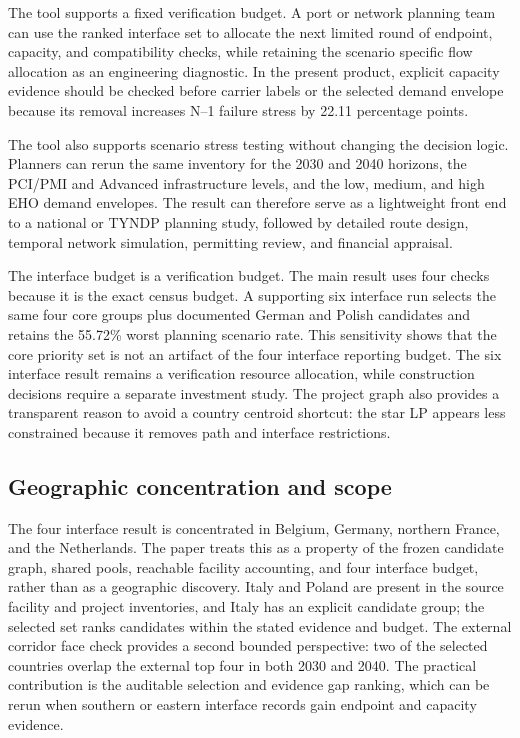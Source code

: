 \documentclass{ieeeaccess}
\begin{document}
The tool supports a fixed verification budget. A port or network planning team can use the ranked interface set to allocate the next limited round of endpoint, capacity, and compatibility checks, while retaining the scenario specific flow allocation as an engineering diagnostic. In the present product, explicit capacity evidence should be checked before carrier labels or the selected demand envelope because its removal increases N--1 failure stress by 22.11 percentage points.

The tool also supports scenario stress testing without changing the decision logic. Planners can rerun the same inventory for the 2030 and 2040 horizons, the PCI/PMI and Advanced infrastructure levels, and the low, medium, and high EHO demand envelopes. The result can therefore serve as a lightweight front end to a national or TYNDP planning study, followed by detailed route design, temporal network simulation, permitting review, and financial appraisal.

The interface budget is a verification budget. The main result uses four checks because it is the exact census budget. A supporting six interface run selects the same four core groups plus documented German and Polish candidates and retains the 55.72\% worst planning scenario rate. This sensitivity shows that the core priority set is not an artifact of the four interface reporting budget. The six interface result remains a verification resource allocation, while construction decisions require a separate investment study. The project graph also provides a transparent reason to avoid a country centroid shortcut: the star LP appears less constrained because it removes path and interface restrictions.

\subsection{Geographic concentration and scope}

The four interface result is concentrated in Belgium, Germany, northern France, and the Netherlands. The paper treats this as a property of the frozen candidate graph, shared pools, reachable facility accounting, and four interface budget, rather than as a geographic discovery. Italy and Poland are present in the source facility and project inventories, and Italy has an explicit candidate group; the selected set ranks candidates within the stated evidence and budget. The external corridor face check provides a second bounded perspective: two of the selected countries overlap the external top four in both 2030 and 2040. The practical contribution is the auditable selection and evidence gap ranking, which can be rerun when southern or eastern interface records gain endpoint and capacity evidence.
\end{document}
